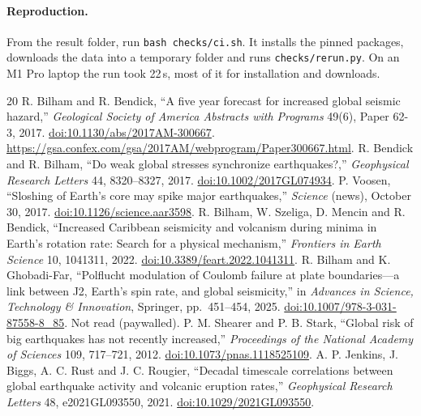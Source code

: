 \documentclass[11pt]{article}
\begin{document}
\paragraph{Reproduction.} From the result folder, run \texttt{bash checks/ci.sh}. It installs the pinned packages, downloads the data into a temporary folder and runs \texttt{checks/rerun.py}. On an M1 Pro laptop the run took 22\,s, most of it for installation and downloads.

\begin{thebibliography}{20}
 R. Bilham and R. Bendick, ``A five year forecast for increased global seismic hazard,'' \emph{Geological Society of America Abstracts with Programs} 49(6), Paper 62-3, 2017. \href{https://doi.org/10.1130/abs/2017AM-300667}{doi:10.1130/abs/2017AM-300667}. \url{https://gsa.confex.com/gsa/2017AM/webprogram/Paper300667.html}.
 R. Bendick and R. Bilham, ``Do weak global stresses synchronize earthquakes?,'' \emph{Geophysical Research Letters} 44, 8320--8327, 2017. \href{https://doi.org/10.1002/2017GL074934}{doi:10.1002/2017GL074934}.
 P. Voosen, ``Sloshing of Earth's core may spike major earthquakes,'' \emph{Science} (news), October 30, 2017. \href{https://doi.org/10.1126/science.aar3598}{doi:10.1126/science.aar3598}.
 R. Bilham, W. Szeliga, D. Mencin and R. Bendick, ``Increased Caribbean seismicity and volcanism during minima in Earth's rotation rate: Search for a physical mechanism,'' \emph{Frontiers in Earth Science} 10, 1041311, 2022. \href{https://doi.org/10.3389/feart.2022.1041311}{doi:10.3389/feart.2022.1041311}.
 R. Bilham and K. Ghobadi-Far, ``Polflucht modulation of Coulomb failure at plate boundaries---a link between J2, Earth's spin rate, and global seismicity,'' in \emph{Advances in Science, Technology \& Innovation}, Springer, pp.~451--454, 2025. \href{https://doi.org/10.1007/978-3-031-87558-8_85}{doi:10.1007/978-3-031-87558-8\_85}. Not read (paywalled).
 P. M. Shearer and P. B. Stark, ``Global risk of big earthquakes has not recently increased,'' \emph{Proceedings of the National Academy of Sciences} 109, 717--721, 2012. \href{https://doi.org/10.1073/pnas.1118525109}{doi:10.1073/pnas.1118525109}.
 A. P. Jenkins, J. Biggs, A. C. Rust and J. C. Rougier, ``Decadal timescale correlations between global earthquake activity and volcanic eruption rates,'' \emph{Geophysical Research Letters} 48, e2021GL093550, 2021. \href{https://doi.org/10.1029/2021GL093550}{doi:10.1029/2021GL093550}.

\end{thebibliography}
\end{document}
